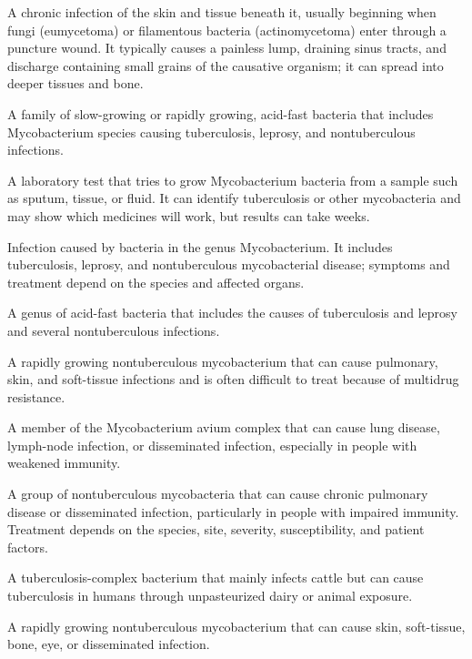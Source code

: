  A chronic infection of the skin and tissue beneath it, usually beginning when fungi (eumycetoma) or filamentous bacteria (actinomycetoma) enter through a puncture wound. It typically causes a painless lump, draining sinus tracts, and discharge containing small grains of the causative organism; it can spread into deeper tissues and bone.

 A family of slow-growing or rapidly growing, acid-fast bacteria that includes Mycobacterium species causing tuberculosis, leprosy, and nontuberculous infections.

 A laboratory test that tries to grow Mycobacterium bacteria from a sample such as sputum, tissue, or fluid. It can identify tuberculosis or other mycobacteria and may show which medicines will work, but results can take weeks.

 Infection caused by bacteria in the genus Mycobacterium. It includes tuberculosis, leprosy, and nontuberculous mycobacterial disease; symptoms and treatment depend on the species and affected organs.

 A genus of acid-fast bacteria that includes the causes of tuberculosis and leprosy and several nontuberculous infections.

 A rapidly growing nontuberculous mycobacterium that can cause pulmonary, skin, and
soft-tissue infections and is often difficult to treat because of multidrug resistance.

 A member of the Mycobacterium avium complex that can cause lung disease, lymph-node infection, or disseminated infection, especially in people with weakened immunity.

 A group of nontuberculous mycobacteria that can cause chronic pulmonary disease
or disseminated infection, particularly in people with impaired immunity. Treatment depends on the species, site,
severity, susceptibility, and patient factors.

 A tuberculosis-complex bacterium that mainly infects cattle but can cause tuberculosis in humans through unpasteurized dairy or animal exposure.

 A rapidly growing nontuberculous mycobacterium that can cause skin, soft-tissue, bone, eye, or disseminated infection.

